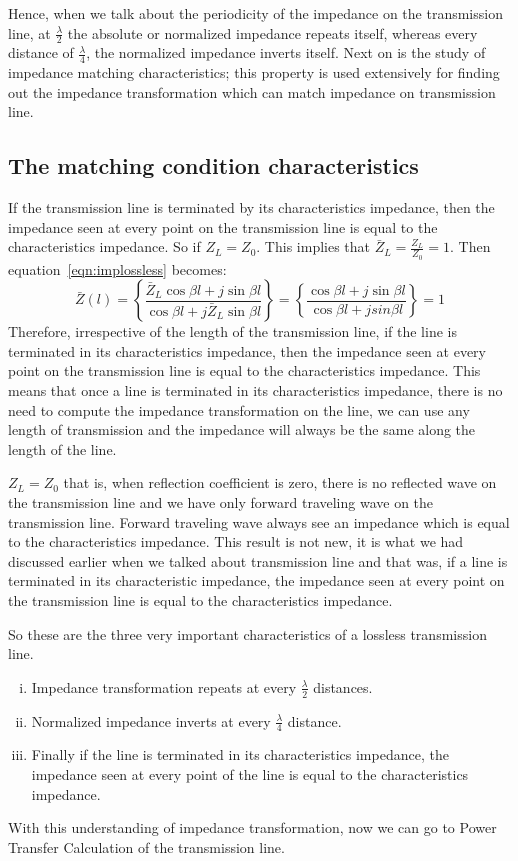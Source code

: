 Hence, when we talk about the periodicity of the impedance on the transmission line, at $\frac{\lambda}{2}$ the absolute or normalized impedance repeats itself, whereas every distance of $\frac{\lambda}{4}$, the normalized impedance inverts itself. Next on is the study of impedance matching characteristics; this property is used extensively for finding out the impedance transformation which can match impedance on transmission line.

\subsection{The matching condition characteristics}
If the transmission line is terminated by its characteristics impedance, then the impedance seen at every point on the transmission line is equal to the characteristics impedance. So if $Z_L=Z_0$. This implies that $\bar{Z}_L= \frac{Z_L}{Z_0}=1$. Then equation~\eqref{eqn:implossless} becomes:
\begin{dmath*}
\bar{Z}(l) = \left\lbrace\frac{\bar{Z}_L\cos\beta l + j\sin\beta l}{\cos\beta l + j\bar{Z}_L\sin\beta l}\right\rbrace = \left\lbrace \frac{\cos\beta l + j\sin\beta l}{\cos\beta l + jsin\beta l}\right\rbrace = 1
\end{dmath*}
Therefore, irrespective of the length of the transmission line, if the line is terminated in its characteristics impedance, then the impedance seen at every point on the transmission line is equal to the characteristics impedance. This means that once a line is terminated in its characteristics impedance, there is no need to compute the impedance transformation on the line, we can use any length of transmission and the impedance will always be the same along the length of the line. 

$Z_L=Z_0$ that is, when reflection coefficient is zero, there is no reflected wave on the transmission line and we have only forward traveling wave on the transmission line. Forward traveling wave always see an impedance which is equal to the characteristics impedance. This result is not new, it is what we had discussed earlier when we talked about transmission line and that was, if a line is terminated in its characteristic impedance, the impedance seen at every point on the transmission line is equal to the characteristics impedance.

So these are the three very important characteristics of a lossless transmission line.
\begin{enumerate}[(i)]
\item Impedance transformation repeats at every $\frac{\lambda}{2}$ distances.
\item Normalized impedance inverts at every $\frac{\lambda}{4}$ distance.
\item Finally if the line is terminated in its characteristics impedance, the impedance seen at every point of the line is equal to the characteristics impedance.
\end{enumerate}
With this understanding of impedance transformation, now we can go to Power Transfer Calculation of the transmission line.


